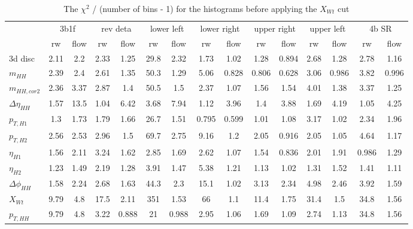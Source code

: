 \begin{table}
\centering\begin{adjustbox}{width=\columnwidth,center}
\label{tab:chi2_ndf}
\begin{tabular}{lcccccccccccccc}
\toprule
{} & \multicolumn{2}{c}{3b1f} & \multicolumn{2}{c}{rev deta} & \multicolumn{2}{c}{lower left} & \multicolumn{2}{c}{lower right} & \multicolumn{2}{c}{upper right} & \multicolumn{2}{c}{upper left} & \multicolumn{2}{c}{4b SR} \\
{} &   rw & flow &       rw &  flow &         rw &  flow &          rw &  flow &          rw &  flow &         rw &  flow &    rw &  flow \\
\midrule
3d disc            & 2.11 &  2.2 &     2.33 &  1.25 &       29.8 &  2.32 &        1.73 &  1.02 &        1.28 & 0.894 &       2.68 &  1.28 &  2.78 &  1.16 \\
$m_{HH}$           & 2.39 &  2.4 &     2.61 &  1.35 &       50.3 &  1.29 &        5.06 & 0.828 &       0.806 & 0.628 &       3.06 & 0.986 &  3.82 & 0.996 \\
$m_{HH,cor2}$      & 2.36 & 3.37 &     2.87 &   1.4 &       50.5 &   1.5 &        2.37 &  1.07 &        1.56 &  1.54 &       4.01 &  1.38 &  3.37 &  1.25 \\
$\Delta \eta_{HH}$ & 1.57 & 13.5 &     1.04 &  6.42 &       3.68 &  7.94 &        1.12 &  3.96 &         1.4 &  3.88 &       1.69 &  4.19 &  1.05 &  4.25 \\
$p_{T,H1}$         &  1.3 & 1.73 &     1.79 &  1.66 &       26.7 &  1.51 &       0.795 & 0.599 &        1.01 &  1.08 &       3.17 &  1.02 &  2.34 &  1.96 \\
$p_{T,H2}$         & 2.56 & 2.53 &     2.96 &   1.5 &       69.7 &  2.75 &        9.16 &   1.2 &        2.05 & 0.916 &       2.05 &  1.05 &  4.64 &  1.17 \\
$\eta_{H1}$        & 1.56 & 2.11 &     3.24 &  1.62 &       2.85 &  1.69 &        2.62 &  1.07 &        1.54 & 0.836 &       2.01 &  1.91 & 0.986 &  1.29 \\
$\eta_{H2}$        & 1.23 & 1.49 &     2.19 &  1.28 &       3.91 &  1.47 &        5.38 &  1.21 &        1.13 &  1.02 &       1.31 &  1.52 &  1.41 &  1.11 \\
$\Delta \phi_{HH}$ & 1.58 & 2.24 &     2.68 &  1.63 &       44.3 &   2.3 &        15.1 &  1.02 &        3.13 &  2.34 &       4.98 &  2.46 &  3.92 &  1.59 \\
$X_{Wt}$           & 9.79 &  4.8 &     17.5 &  2.11 &        351 &  1.53 &          66 &   1.1 &        11.4 &  1.75 &       31.4 &   1.5 &  34.8 &  1.56 \\
$p_{T,HH}$         & 9.79 &  4.8 &     3.22 & 0.888 &         21 & 0.988 &        2.95 &  1.06 &        1.69 &  1.09 &       2.74 &  1.13 &  34.8 &  1.56 \\
\bottomrule
\end{tabular}
\end{adjustbox}\caption{The $\chi^2$ / (number of bins - 1) for the histograms before applying the $X_{Wt}$ cut}\end{table}
